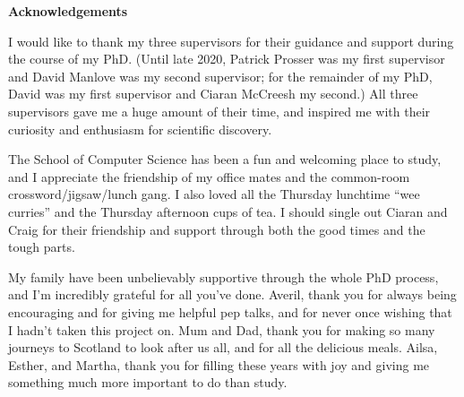 \vspace*{1.75in}

\begin{center} {\bf Acknowledgements}\end{center}

I would like to thank my three supervisors for their guidance and support during the course of my PhD.  (Until late 2020, Patrick Prosser was my first supervisor and David Manlove was my second supervisor; for the remainder of my PhD, David was my first supervisor and Ciaran McCreesh my second.)  All three supervisors gave me a huge amount of their time, and inspired me with their curiosity and enthusiasm for scientific discovery.

The School of Computer Science has been a fun and welcoming place to study, and I appreciate the friendship of my office mates and the common-room crossword/jigsaw/lunch gang.
I also loved all the Thursday lunchtime ``wee curries'' and the Thursday afternoon cups of tea.
I should single out Ciaran and Craig for their friendship and support through both the good times and the tough parts.

My family have been unbelievably supportive through the whole PhD process, and I'm incredibly grateful for all you've done. Averil, thank you for always being encouraging and for giving me helpful pep talks, and for never once wishing that I hadn't taken this project on. Mum and Dad, thank you for making so many journeys to Scotland to look after us all, and for all the delicious meals. Ailsa, Esther, and Martha, thank you for filling these years with joy and giving me something much more important to do than study.
